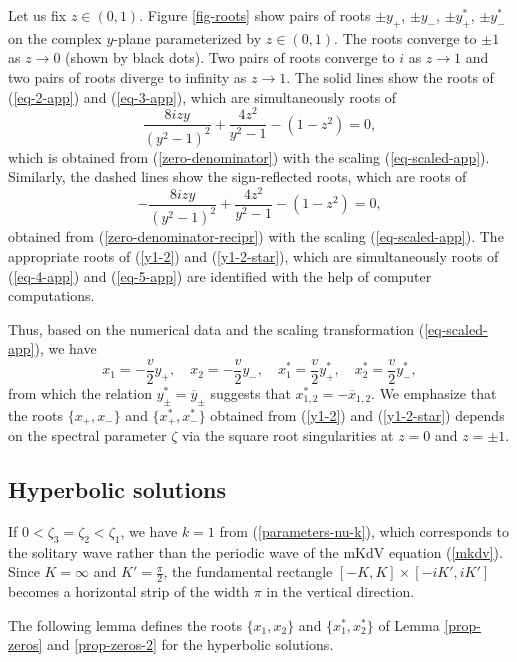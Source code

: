 \documentclass[12pt,reqno]{amsart}
\numberwithin{equation}{section}
\begin{document}
Let us fix $z \in (0,1)$. Figure \ref{fig-roots} show 
pairs of roots $\pm y_+$, $\pm y_-$, $\pm y_+^*$, $\pm y_-^*$ on the 
complex $y$-plane parameterized by $z \in (0,1)$. The roots converge to $\pm 1$ as $z \to 0$ (shown by black dots). Two pairs of roots converge to $i$ as $z \to 1$ and two pairs of roots diverge to infinity as $z \to 1$. 
The solid lines show the roots of (\ref{eq-2-app}) and (\ref{eq-3-app}), 
which are simultaneously roots of 
\begin{equation}
\label{eq-4-app}
\frac{8 i zy}{(y^2-1)^2} + \frac{4 z^2}{y^2-1} - (1-z^2) = 0,
\end{equation}
which is obtained from (\ref{zero-denominator}) with the scaling (\ref{eq-scaled-app}). Similarly, the dashed lines show the sign-reflected 
roots, which are roots of 
\begin{equation}
\label{eq-5-app}
-\frac{8 i zy}{(y^2-1)^2} + \frac{4 z^2}{y^2-1} - (1-z^2) = 0,
\end{equation}
obtained from (\ref{zero-denominator-recipr}) with the scaling (\ref{eq-scaled-app}). The appropriate roots of (\ref{y1-2}) and (\ref{y1-2-star}), which are simultaneously roots of (\ref{eq-4-app}) and (\ref{eq-5-app}) are identified with the help of computer computations. 

Thus, based on the numerical data and 
the scaling transformation (\ref{eq-scaled-app}), we have 
$$
x_1 = -\frac{v}{2} y_+, \quad 
x_2 = -\frac{v}{2} y_-, \quad 
x_1^* = \frac{v}{2} y_+^*, \quad 
x_2^* = \frac{v}{2} y_-^*,
$$
from which the relation $y_{\pm}^* = \overline{y}_{\pm}$ suggests 
that $x_{1,2}^* = -\overline{x}_{1,2}$. We emphasize that 
the roots $\{ x_+,x_-\}$ and $\{ x_+^*,x_-^*\}$ obtained from 
(\ref{y1-2}) and (\ref{y1-2-star}) depends on the spectral 
parameter $\zeta$ via the square root singularities 
at $z = 0$ and $z = \pm 1$. 

\subsection{Hyperbolic solutions} 
\label{sec-5-2}

If $0 < \zeta_3 = \zeta_2 < \zeta_1$, we have $k = 1$ from (\ref{parameters-nu-k}), which corresponds to the solitary wave rather than 
the periodic wave of the mKdV equation (\ref{mkdv}). Since
$K = \infty$ and $K' = \frac{\pi}{2}$, the fundamental rectangle $[-K,K] \times [-iK',iK']$ becomes a horizontal strip of the width $\pi$ in the vertical direction. 

The following lemma defines the roots $\{ x_1, x_2\}$ and $\{ x_1^*,x_2^*\}$
of Lemma \ref{prop-zeros} and \ref{prop-zeros-2} for the hyperbolic solutions. 
\end{document}
